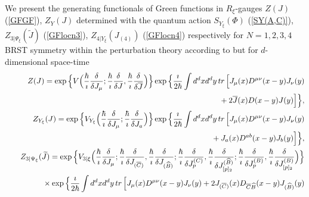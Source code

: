 \documentclass[10pt]{article}
\begin{document}
We present the generating functionals of Green  functions in $R_\xi$-gauges  $
   Z(J)$ (\ref{GFGF}), $Z_Y(J)$ determined with the quantum action $S_{Y_\xi}(\Phi)$ (\ref{SY(A,C)}), ${Z}_{3|\Psi_{\xi}}(\widetilde{J})$ (\ref {GFlocn3}),  $
  {Z}_{4|Y_{\xi}}({J}_{(4)})$ (\ref{GFlocn4}) respectively for $N=1,2,3,4$ BRST symmetry   within the perturbation theory   according to \cite{bookfaddeevslavnov} but for $d$-dimensional space-time
 \begin{eqnarray}
&\hspace{-0.5em}& \hspace{-0.5em}  Z(J) =  \exp\Big\{V\Big(\frac{\hbar}{\imath} \frac{\delta}{\delta J_\mu};\frac{\hbar}{\imath} \frac{\delta}{\delta J},\frac{\hbar}{\imath} \frac{\delta}{\delta \overline{J}} \Big)\Big\}\exp\Big\{\frac{\imath}{2 \hbar} \int d^dx d^dy \,tr\, \Big[ J_{\mu}(x) D^{\mu\nu}(x-y)J_{\nu}(y)
\nonumber \\
&\hspace{-0.5em}& \hspace{-0.5em}  \phantom{Z(J)=} + 2\overline{J}(x)D(x-y)J(y)  \Big] \Big\},\label{GFGFps1}\\
&\hspace{-0.5em}& \hspace{-0.5em}   Z_{Y_{\xi}}(J)= \exp\Big\{V_{Y_\xi}\Big(\frac{\hbar}{\imath} \frac{\delta}{\delta J_\mu};\frac{\hbar}{\imath} \frac{\delta}{\delta J_a} \Big)\Big\}\exp\Big\{\frac{\imath}{2 \hbar} \int d^dx d^dy \,tr\, \Big[ J_{\mu}(x) D^{\mu\nu}(x-y)J_{\nu}(y) \nonumber \\
&\hspace{-0.5em}& \hspace{-0.5em}  \phantom{Z_{Y_{\xi}}(J)=}+ {J}_a(x)D^{ab}(x-y)J_b(y)  \Big] \Big\}, \label{GFGFps2} \\
&\hspace{-0.5em}& \hspace{-0.5em}   Z_{3|\Psi_{\xi}}(\widetilde{J})= \exp\Big\{V_{3|{\xi}}\Big(\frac{\hbar}{\imath} \frac{\delta}{\delta J_\mu};\frac{\hbar}{\imath} \frac{\delta}{\delta J_{(\overline{C})}},\frac{\hbar}{\imath} \frac{\delta}{\delta J_{(\widehat{B})}}; \frac{\hbar}{\imath} \frac{\delta}{\delta J^{(C)}_p},\frac{\hbar}{\imath} \frac{\delta}{\delta J^{(\widehat{B})}_{[p]_2}}; \frac{\hbar}{\imath} \frac{\delta}{\delta J^{(B)}_p},\frac{\hbar}{\imath} \frac{\delta}{\delta J^{({B})}_{[p]_2}} \Big)\Big\} \nonumber \\
&\hspace{-0.5em}& \hspace{-0.5em}  \phantom{Z_{3|\Psi_{\xi}}(\widetilde{J})=} \times \exp\Big\{\frac{\imath}{2 \hbar} \int d^dx d^dy \,tr\, \Big[ J_{\mu}(x) D^{\mu\nu}(x-y)J_{\nu}(y) + 2 J_{(\overline{C})}(x)D_{\overline{C}\widehat{B}}(x-y)J_{(\widehat{B})}(y)  \nonumber \\

\end{eqnarray}
\end{document}

